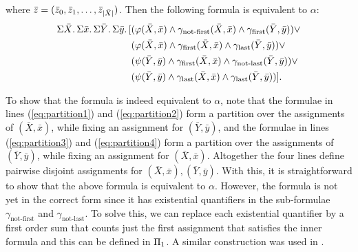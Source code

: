 where $\bar{z} = (\bar{z}_0,\bar{z}_1,\ldots,\bar{z}_{\vert \bar{X} \vert})$. Then the following formula is equivalent to $\alpha$:
\begin{align}
\Sigma{\bar{X}}.\,\Sigma{\bar{x}}.\,\Sigma{\bar{Y}}.\,\Sigma{\bar{y}}.\,[&(\varphi(\bar{X},\bar{x})\wedge\gamma_{\text{not-first}}(\bar{X},\bar{x})\wedge\gamma_{\text{first}}(\bar{Y},\bar{y}))\vee \label{eq:partition1} \\
&(\varphi(\bar{X},\bar{x})\wedge\gamma_{\text{first}}(\bar{X},\bar{x})\wedge\gamma_{\text{last}}(\bar{Y},\bar{y}))\vee \label{eq:partition2}\\
&(\psi(\bar{Y},\bar{y})\wedge\gamma_{\text{first}}(\bar{X},\bar{x})\wedge\gamma_{\text{not-last}}(\bar{Y},\bar{y}))\vee \label{eq:partition3}\\
&(\psi(\bar{Y},\bar{y})\wedge\gamma_{\text{last}}(\bar{X},\bar{x})\wedge\gamma_{\text{last}}(\bar{Y},\bar{y}))]. \label{eq:partition4}
\end{align}

To show that the formula is indeed equivalent to $\alpha$, note that the formulae in lines (\ref{eq:partition1}) and (\ref{eq:partition2}) form a partition over the assignments of $(\bar{X},\bar{x})$, while fixing an assignment for $(\bar{Y},\bar{y})$, and the formulae in lines (\ref{eq:partition3}) and (\ref{eq:partition4}) form a partition over the assignments of $(\bar{Y},\bar{y})$, while fixing an assignment for $(\bar{X},\bar{x})$. 
Altogether the four lines define pairwise disjoint assignments for $(\bar{X},\bar{x}),(\bar{Y},\bar{y})$. 
With this, it is straightforward to show that the above formula is equivalent to $\alpha$. 
However, the formula is not yet in the correct form since it has existential quantifiers in the sub-formulae $\gamma_{\text{not-first}}$ and $\gamma_{\text{not-last}}$. 
To solve this, we can replace each existential quantifier by a first order sum that counts just the first assignment that satisfies the inner formula and this can be defined in $\Pi_{1}$. 
A similar construction was used in \cite{SalujaST95}. 

